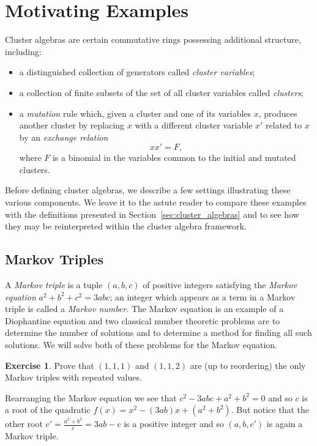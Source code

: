 \documentclass{amsart}
\theoremstyle{definition}
\newtheorem{example}[theorem]{Example}
\newtheorem{exercise}[theorem]{Exercise}
\theoremstyle{remark}
\numberwithin{equation}{section}
\begin{document}
\section{Motivating Examples}\label{sec:motivation}
	Cluster algebras are certain commutative rings possessing additional structure, including:
	\begin{itemize}
		\item a distinguished collection of generators called \emph{cluster variables};
		\item a collection of finite subsets of the set of all cluster variables called \emph{clusters};
		\item a \emph{mutation} rule which, given a cluster and one of its variables $x$, produces another cluster by replacing $x$ with a different cluster variable $x'$ related to $x$ by an \emph{exchange relation}
		\begin{displaymath}
			xx' = F,
		\end{displaymath}
		where $F$ is a binomial in the variables common to the initial and mutated clusters.
	\end{itemize}
	Before defining cluster algebras, we describe a few settings illustrating these various components.  We leave it to the astute reader to compare these examples with the definitions presented in Section~\ref{sec:cluster_algebras} and to see how they may be reinterpreted within the cluster algebra framework.

	\subsection{Markov Triples} \label{sub:Markov triples}
    A \emph{Markov triple} is a tuple $(a,b,c)$ of positive integers satisfying the \emph{Markov equation} $a^2+b^2+c^2=3abc$; an integer which appears as a term in a Markov triple is called a \emph{Markov number}.  The Markov equation is an example of a Diophantine equation and two classical number theoretic problems are to determine the number of solutions and to determine a method for finding all such solutions.  We will solve both of these problems for the Markov equation.
    
    \begin{exercise}
      Prove that $(1,1,1)$ and $(1,1,2)$ are (up to reordering) the only Markov triples with repeated values.
    \end{exercise}
    Rearranging the Markov equation we see that $c^2-3abc+a^2+b^2=0$ and so $c$ is a root of the quadratic $f(x)=x^2-(3ab)x+(a^2+b^2)$.  But notice that the other root $c'=\frac{a^2+b^2}{c}=3ab-c$ is a positive integer and so $(a,b,c')$ is again a Markov triple.  
\end{document}
